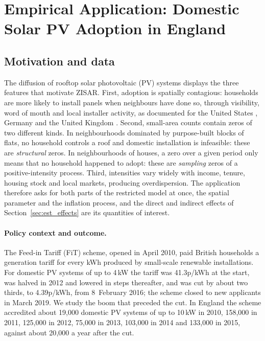 \section{Empirical Application: Domestic Solar PV Adoption in England}\label{sec:solar}

\subsection{Motivation and data}\label{sec:solar_data}

The diffusion of rooftop solar photovoltaic (PV) systems displays the three features that motivate ZISAR.
First, adoption is spatially contagious: households are more likely to install panels when neighbours have done so, through visibility, word of mouth and local installer activity, as documented for the United States \citep{bollinger_gillingham2012,graziano_gillingham2015,kwan2012}, Germany \citep{rode_weber2016,dharshing2017,schaffer_brun2015} and the United Kingdom \citep{balta_ozkan2015,snape2016}.
Second, small-area counts contain zeros of two different kinds.
In neighbourhoods dominated by purpose-built blocks of flats, no household controls a roof and domestic installation is infeasible: these are \emph{structural} zeros.
In neighbourhoods of houses, a zero over a given period only means that no household happened to adopt: these are \emph{sampling} zeros of a positive-intensity process.
Third, intensities vary widely with income, tenure, housing stock and local markets, producing overdispersion.
The application therefore asks for both parts of the restricted model at once, the spatial parameter and the inflation process, and the direct and indirect effects of Section~\ref{sec:est_effects} are its quantities of interest.

\paragraph{Policy context and outcome.}
The Feed-in Tariff (FiT) scheme, opened in April 2010, paid British households a generation tariff for every kWh produced by small-scale renewable installations.
For domestic PV systems of up to 4\,kW the tariff was 41.3p/kWh at the start, was halved in 2012 and lowered in steps thereafter, and was cut by about two thirds, to 4.39p/kWh, from 8~February 2016; the scheme closed to new applicants in March 2019.
We study the boom that preceded the cut.
In England the scheme accredited about 19{,}000 domestic PV systems of up to 10\,kW in 2010, 158{,}000 in 2011, 125{,}000 in 2012, 75{,}000 in 2013, 103{,}000 in 2014 and 133{,}000 in 2015, against about 20{,}000 a year after the cut.

